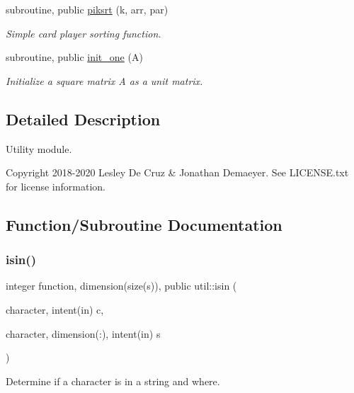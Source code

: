 \begin{DoxyCompactItemize}
subroutine, public \hyperlink{namespaceutil_af8d0a8ec8cb7391ddbf455dc92f2189d}{piksrt} (k, arr, par)
\begin{DoxyCompactList}\small\item\em Simple card player sorting function. \end{DoxyCompactList}\item 
\mbox{\label{namespaceutil_aca7f2465fedb87fef954d8f0c30668c7}} 
subroutine, public \hyperlink{namespaceutil_aca7f2465fedb87fef954d8f0c30668c7}{init\+\_\+one} (A)
\begin{DoxyCompactList}\small\item\em Initialize a square matrix A as a unit matrix. \end{DoxyCompactList}\end{DoxyCompactItemize}


\subsection{Detailed Description}
Utility module. 

\begin{DoxyCopyright}{Copyright}
2018-\/2020 Lesley De Cruz \& Jonathan Demaeyer. See L\+I\+C\+E\+N\+S\+E.\+txt for license information. 
\end{DoxyCopyright}


\subsection{Function/\+Subroutine Documentation}
\mbox{\label{namespaceutil_a1e2cd46baa2070e28949e28c8a3e037e}} 
\subsubsection{\texorpdfstring{isin()}{isin()}}
{\footnotesize\ttfamily integer function, dimension(size(s)), public util\+::isin (\begin{DoxyParamCaption}\item[{character, intent(in)}]{c,  }\item[{character, dimension(\+:), intent(in)}]{s }\end{DoxyParamCaption})}



Determine if a character is in a string and where. 

